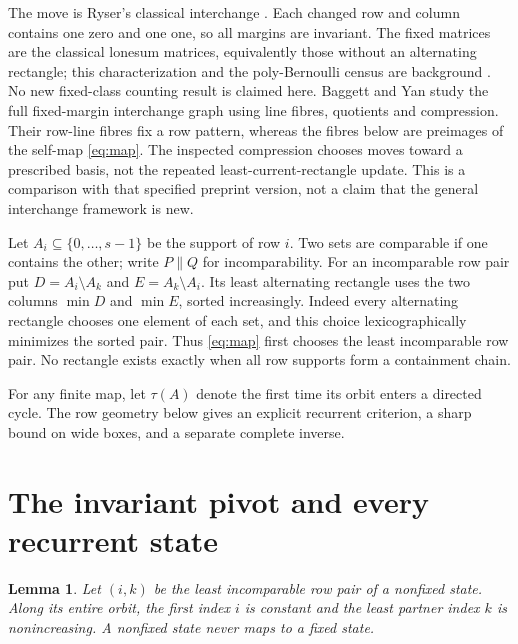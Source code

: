 \documentclass[a4paper,10pt]{amsart}
\newtheorem{lemma}[theorem]{Lemma}
\theoremstyle{remark}
\newcommand{\inc}{\mathrel{\|}}
\begin{document}
The move is Ryser's classical interchange
\cite[Section 3]{ryser1957combinatorial}. Each changed row and column
contains one zero and one one, so all margins are invariant.
The fixed matrices are the classical lonesum matrices, equivalently those
without an alternating rectangle; this characterization and the
poly-Bernoulli census are background \cite[Section 1]{brewbaker2008combinatorial}.
No new fixed-class counting result is claimed here.
Baggett and Yan \cite[Section 2.1 and the proof of Lemma 5.10]{baggett2026interchange}
study the full fixed-margin interchange graph using line fibres,
quotients and compression. Their row-line fibres fix a row pattern, whereas
the fibres below are preimages of the self-map \eqref{eq:map}. The
inspected compression chooses moves toward a prescribed basis, not the
repeated least-current-rectangle update.
This is a comparison with that specified preprint version, not a claim
that the general interchange framework is new.

Let $A_i\subseteq\{0,\ldots,s-1\}$ be the support of row $i$.
Two sets are comparable if one contains the other; write $P\inc Q$
for incomparability. For an incomparable row pair put
$D=A_i\setminus A_k$ and $E=A_k\setminus A_i$. Its least alternating
rectangle uses the two columns $\min D$ and $\min E$, sorted increasingly.
Indeed every alternating rectangle chooses one element of each set,
and this choice lexicographically minimizes the sorted pair. Thus
\eqref{eq:map} first chooses the least incomparable row pair.
No rectangle exists exactly when all row supports form a containment chain.

For any finite map, let $\tau(A)$ denote the first time its orbit enters
a directed cycle. The row geometry below gives an explicit recurrent
criterion, a sharp bound on wide boxes, and a separate complete inverse.

\section{The invariant pivot and every recurrent state}

\begin{lemma}\label{lem:pivot}
Let $(i,k)$ be the least incomparable row pair of a nonfixed state.
Along its entire orbit, the first index $i$ is constant and the least
partner index $k$ is nonincreasing. A nonfixed state never maps to a
fixed state.
\end{lemma}
\end{document}
